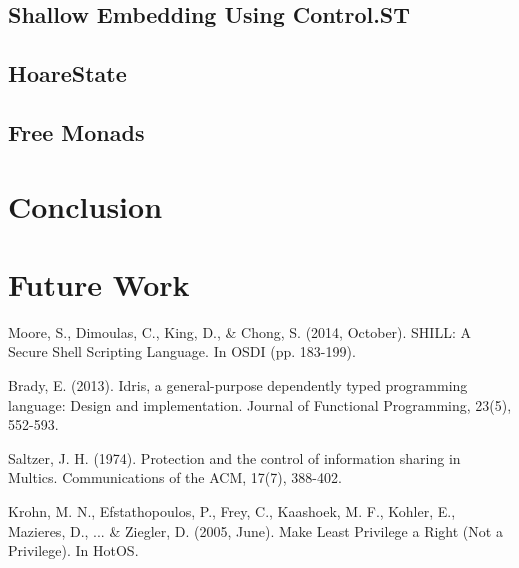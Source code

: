 \documentclass[11pt,a4paper]{article}
\begin{document}
\subsection{Shallow Embedding Using Control.ST}

\subsection{HoareState}

\subsection{Free Monads}

\section{Conclusion}

\section{Future Work}

\begin{thebibliography}{99}
Moore, S., Dimoulas, C., King, D., \& Chong, S. (2014, October). SHILL: A Secure Shell Scripting Language. In OSDI (pp. 183-199).

Brady, E. (2013). Idris, a general-purpose dependently typed programming language: Design and implementation. Journal of Functional Programming, 23(5), 552-593.

Saltzer, J. H. (1974). Protection and the control of information sharing in Multics. Communications of the ACM, 17(7), 388-402.

Krohn, M. N., Efstathopoulos, P., Frey, C., Kaashoek, M. F., Kohler, E., Mazieres, D., ... \& Ziegler, D. (2005, June). Make Least Privilege a Right (Not a Privilege). In HotOS.

\end{thebibliography}
\end{document}
